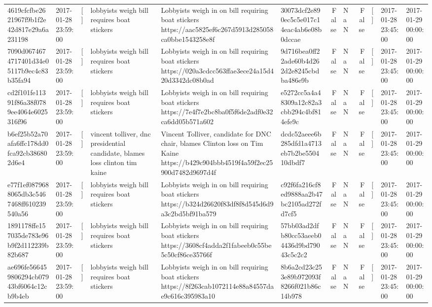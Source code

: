 \begin{tabular}{llllllrlrlll}
4619cfcfbe2621967f9b1f2e42d817e29a6a231198 & 2017-01-28 23:59:00 & [] & lobbyists weigh bill requires boat stickers & Lobbyists weigh in on bill requiring boat stickers https://aac5825ef6c267d5913d285058ca0bbe1543258e8f & 30073dcf2e890ec5c5e017c14eac4ab6e08b0dccae & False & NaN & False & [] & 2017-01-28 23:45:00 & 2017-01-29 00:00:00 \\
7090d0674674717401d34e05117b9ec4c83b35fa94 & 2017-01-28 23:59:00 & [] & lobbyists weigh bill requires boat stickers & Lobbyists weigh in on bill requiring boat stickers https://020a3cdcc563ffae3ece24a15d420d3342dc08b0ad & 9d716bea0ff22ade60b4d262d2e8245cbdba486e9b & False & NaN & False & [] & 2017-01-28 23:45:00 & 2017-01-29 00:00:00 \\
cd2f101fe11391f86a38f0789ee4064e6025316f96 & 2017-01-28 23:59:00 & [] & lobbyists weigh bill requires boat stickers & Lobbyists weigh in on bill requiring boat stickers https://7e4f7e2bc8ba0f5f6de2adf0e32ca6dd05b571a602 & e5272cc5a4a48309a12c82a3cbb294c4bf814efe9c & False & NaN & False & [] & 2017-01-28 23:45:00 & 2017-01-29 00:00:00 \\
b6ef25b52a70afa6ffc178dd0fca92cb386802d6e4 & 2017-01-28 23:59:00 & [] & vincent tolliver, dnc presidential candidate, blames loss clinton tim kaine & Vincent Tolliver, candidate for DNC chair, blames Clinton loss on Tim Kaine https://b429c904bbb4519f4a59f2ec25900d7482d9697d4f & dcdc52aeee6b285dfd1a4713eb7b2be550410dbdf7 & False & NaN & False & [] & 2017-01-28 23:45:00 & 2017-01-29 00:00:00 \\
e77f1ef0879688065db3c5467468ff610239540a56 & 2017-01-28 23:59:00 & [] & lobbyists weigh bill requires boat stickers & Lobbyists weigh in on bill requiring boat stickers https://b324d26620f83df8f8d545d6d9a3c2bd5bf91ba579 & c92f6fa216cf8ed9888aa2b47bc2105ad272fd7cf5 & False & NaN & False & [] & 2017-01-28 23:45:00 & 2017-01-29 00:00:00 \\
1891178ffe157035de783e96b9f2d112239b82b687 & 2017-01-28 23:59:00 & [] & lobbyists weigh bill requires boat stickers & Lobbyists weigh in on bill requiring boat stickers https://3608cf4adda2f1fabeeb0c55be5c50cf86ce35766f & 57bb03ad2dfb80cc53aeeb04436d9bd79043c5c2c2 & False & NaN & False & [] & 2017-01-28 23:45:00 & 2017-01-29 00:00:00 \\
ae696fe566459806294cb07943bf6064c12cb9b4eb & 2017-01-28 23:59:00 & [] & lobbyists weigh bill requires boat stickers & Lobbyists weigh in on bill requiring boat stickers https://8f263cab1072114e88a84557dae9c616c395983a10 & 8b6a2cd23c253e89b972093f8266f021b86c14b978 & False & NaN & False & [] & 2017-01-28 23:45:00 & 2017-01-29 00:00:00 \\

\end{tabular}
